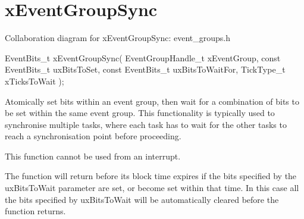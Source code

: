 \hypertarget{group__x_event_group_sync}{}\section{x\+Event\+Group\+Sync}
\label{group__x_event_group_sync}
Collaboration diagram for x\+Event\+Group\+Sync\+:
event\+\_\+groups.\+h 
\begin{DoxyPre}
   EventBits\_t xEventGroupSync(    EventGroupHandle\_t xEventGroup,
                                   const EventBits\_t uxBitsToSet,
                                   const EventBits\_t uxBitsToWaitFor,
                                   TickType\_t xTicksToWait );
  \end{DoxyPre}


Atomically set bits within an event group, then wait for a combination of bits to be set within the same event group. This functionality is typically used to synchronise multiple tasks, where each task has to wait for the other tasks to reach a synchronisation point before proceeding.

This function cannot be used from an interrupt.

The function will return before its block time expires if the bits specified by the ux\+Bits\+To\+Wait parameter are set, or become set within that time. In this case all the bits specified by ux\+Bits\+To\+Wait will be automatically cleared before the function returns.


